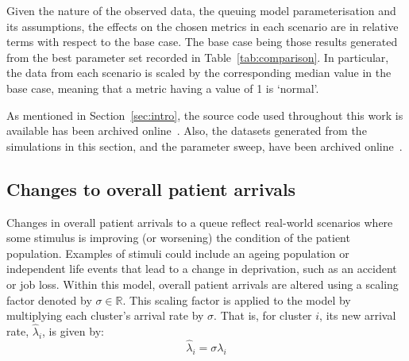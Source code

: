 Given the nature of the observed data, the queuing model parameterisation and
its assumptions, the effects on the chosen metrics in each scenario are in
relative terms with respect to the base case. The base case being those results
generated from the best parameter set recorded in Table~\ref{tab:comparison}. In
particular, the data from each scenario is scaled by the corresponding median
value in the base case, meaning that a metric having a value of 1 is ‘normal’.

As mentioned in Section~\ref{sec:intro}, the source code used throughout this
work is available has been archived online~\cite{Wilde2020github}. Also, the
datasets generated from the simulations in this section, and the parameter
sweep, have been archived online~\cite{Wilde2020results}.

\subsection{Changes to overall patient arrivals}\label{subsec:arrivals}

Changes in overall patient arrivals to a queue reflect real-world scenarios
where some stimulus is improving (or worsening) the condition of the patient
population. Examples of stimuli could include an ageing population or
independent life events that lead to a change in deprivation, such as an
accident or job loss. Within this model, overall patient arrivals are altered
using a scaling factor denoted by \(\sigma\in\mathbb{R}\). This scaling factor
is applied to the model by multiplying each cluster's arrival rate by
\(\sigma\). That is, for cluster \(i\), its new arrival rate, \(\hat\lambda_i\),
is given by:
\begin{equation}\label{eq:lambda}
    \hat\lambda_{i} = \sigma\lambda_i
\end{equation}

